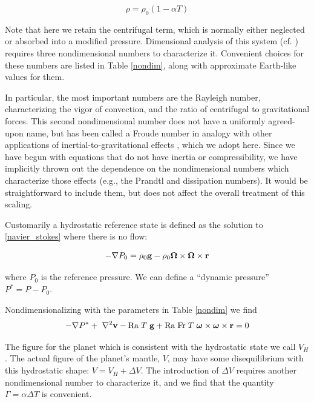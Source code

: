 \documentclass[extra,mreferee]{gji}
\begin{document}
\begin{equation}
\rho = \rho_0 \left( 1 - \alpha T \right)
\label{eos}
\end{equation}

Note that here we retain the centrifugal term, which is normally either neglected or absorbed into a modified pressure.
Dimensional analysis of this system (cf. \citet{barenblatt1996scaling}) requires three nondimensional numbers to characterize it.
Convenient choices for these numbers are listed in Table \ref{nondim}, along with approximate Earth-like values for them.

In particular, the most important numbers are the Rayleigh number, characterizing the vigor of convection, and the ratio of centrifugal to gravitational forces.
This second nondimensional number does not have a uniformly agreed-upon name, but has been called a Froude number in analogy with other applications of inertial-to-gravitational effects \citep{mckenzie1968influence}, which we adopt here.
Since we have begun with equations that do not have inertia or compressibility, we have implicitly thrown out the dependence on the nondimensional numbers which characterize those effects (e.g., the Prandtl and dissipation numbers).
It would be straightforward to include them, but does not affect the overall treatment of this scaling.

Customarily a hydrostatic reference state is defined as the solution to \ref{navier_stokes} where there is no flow:

\begin{equation}
\begin{aligned}
- \nabla P_0 =  \rho_0 {\bf g} -  \rho_0 {\bf \Omega \times \Omega \times r}
\label{hydrostatic}
\end{aligned}
\end{equation}

where $P_0$ is the reference pressure.
We can define a ``dynamic pressure'' $P^* = P - P_0$.

Nondimensionalizing with the parameters in Table \ref{nondim} we find
\begin{equation}
\begin{aligned}
 - \nabla P^* + \; \nabla^2{\bf v} - \mathrm{Ra} \; T \; {\bf g} + \mathrm{Ra \; Fr}\; T \;{\mitbf{\omega} \times \mitbf{\omega} \times {\bf r}} = 0
\end{aligned}
\end{equation}


The figure for the planet which is consistent with the hydrostatic state we call $V_H$.
The actual figure of the planet's mantle, $V$, may have some disequilibrium with this hydrostatic shape: $V = V_H + \Delta V $.
The introduction of $\Delta V$ requires another nondimensional number to characterize it, and we find that the quantity $\Gamma = \alpha \Delta T$ is convenient.
\end{document}
